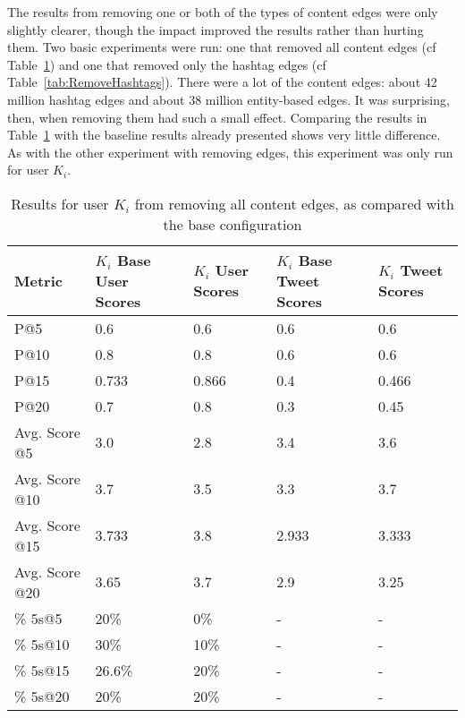 The results from removing one or both of the types of content edges were only slightly clearer, though the impact improved the results rather than hurting them. Two basic experiments were run: one that removed all content edges (cf Table~\ref{tab:RemoveContent}) and one that removed only the hashtag edges (cf Table~\ref{tab:RemoveHashtags}). There were a lot of the content edges: about 42 million hashtag edges and about 38 million entity-based edges. It was surprising, then, when removing them had such a small effect. Comparing the results in Table~\ref{tab:RemoveContent} with the baseline results already presented shows very little difference. As with the other experiment with removing edges, this experiment was only run for user $K_{i}$.

\begin{table}
\centering
\begin{tabular}{l|p{2.2cm}|p{2.2cm}|p{2.2cm}|p{2.2cm}}
{\bf Metric} & {\bf $K_{i}$ Base User Scores} & {\bf $K_{i}$ User Scores} & {\bf $K_{i}$ Base Tweet Scores} & {\bf $K_{i}$ Tweet Scores} \\ \hline
P@5   & 0.6 & 0.6 & 0.6 & 0.6 \\ \hline
P@10 & 0.8 & 0.8 & 0.6 & 0.6 \\ \hline
P@15 & 0.733 & 0.866 & 0.4 & 0.466 \\ \hline
P@20 & 0.7 & 0.8 & 0.3 & 0.45 \\ \hline

Avg. Score @5   & 3.0 & 2.8 & 3.4 & 3.6 \\ \hline
Avg. Score @10 & 3.7 & 3.5 & 3.3 & 3.7 \\ \hline
Avg. Score @15 & 3.733 & 3.8 & 2.933 & 3.333 \\ \hline
Avg. Score @20 & 3.65 & 3.7 & 2.9 & 3.25 \\ \hline

\% 5s@5    & 20\% & 0\% & - & - \\ \hline
\% 5s@10  & 30\% & 10\% & - & - \\ \hline
\% 5s@15  & 26.6\% & 20\% & - & - \\ \hline
\% 5s@20  & 20\% & 20\% & - & - \\

\end{tabular}
\caption{Results for user $K_{i}$ from removing all content edges, as compared with the base configuration}
\label{tab:RemoveContent}
\end{table}


